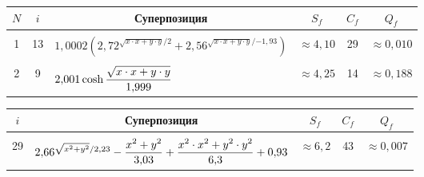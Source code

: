 \begin{multicols}{2}
\begin{table*}
\begin{center}
\begin{tabular}{| c | c | l | c | c | c |} 
  \hline
    $N$ & $i$   & \multicolumn{1}{c|}{Суперпозиция}  & $S_f$                & $C_f$ & $Q_f$             \\ 
    \hline
    &&&&&\\[-9pt]
    1   & 13    & $ 1{,}0002 \left(2{,}72^{\sqrt{x \cdot x + y \cdot y}/2} + 
    2{,}56^{\sqrt{x \cdot x + y \cdot y}/{-1{,}93}}\right)$ & 
    $\approx 4{,}10$     & 29    & $\approx 0{,}010$    \\ 
    \hline
    &&&&&\\[-9pt]
    2   & \hphantom{9}9     & $ 2{,}001 \cosh \displaystyle\frac{\displaystyle \sqrt{x \cdot x + y \cdot y}\mathstrut}{\displaystyle 1{,}999\mathstrut}$& 
    $\approx 4{,}25$   & 14    & $\approx 0{,}188$   \\ 
    \hline
  \end{tabular}
  \end{center}
\end{table*}

\begin{table*}\small
\begin{center}
  \label{tabl:results_Z}
  \vspace{2ex}
  
  \begin{tabular}{| c | c | c | c | c |} 
  \hline
    $i$ & Суперпозиция  & $S_f$                & $C_f$ & $Q_f$             \\ 
    \hline
    &&&&\\[-9pt]
    29  & $ 2{,}66^{\sqrt{x^2 + y^2}/{2{,}23}} - 
    \displaystyle\frac{\displaystyle x^2 + y^2\mathstrut}{\displaystyle 3{,}03\mathstrut} + \displaystyle\frac{\displaystyle x^2 \cdot x^2 + y^2\cdot  y^2\mathstrut}{\displaystyle 6{,}3\mathstrut} + 0{,}93$
             & $\approx 6{,}2$     & 43    & $ \approx 0{,}007 $ \\ 
             \hline
  \end{tabular}
  \end{center}
\end{table*}

\begin{figure*} %
\vspace*{1pt}
 \begin{center}
 \mbox{%
 \epsfxsize=160.163mm
 }
 \end{center}
 \vspace*{-9pt}
\end{figure*}
\begin{figure*} %
\vspace*{-3pt}
 \begin{center}
 \mbox{%
 \epsfxsize=160.163mm
 }
 \end{center}
 \vspace*{-11pt}
\end{figure*}


\end{multicols}
